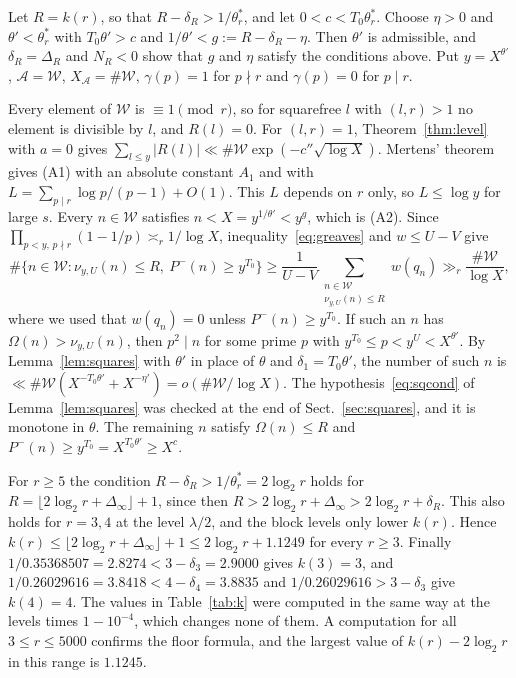 \documentclass[11pt]{amsart}
\makeatletter
\theoremstyle{definition}
\numberwithin{equation}{section}
\renewenvironment{proof}[1][\proofname]{\par\pushQED{\qed}\normalfont\topsep6\p@\@plus6\p@\relax\trivlist\item[\hskip\labelsep\upshape#1.]\ignorespaces}{\popQED\endtrivlist\@endpefalse}
\newcommand{\WW}{\mathcal{W}}
\makeatother
\begin{document}
\begin{proof}[Proof of Corollary~\ref{cor:almost}]
Let $R=k(r)$, so that $R-\delta_R>1/\theta^*_r$, and let $0<c<T_0\theta^*_r$. Choose $\eta>0$ and $\theta'<\theta^*_r$ with $T_0\theta'>c$ and $1/\theta'<g:=R-\delta_R-\eta$. Then $\theta'$ is admissible, and $\delta_R=\Delta_R$ and $N_R<0$ show that $g$ and $\eta$ satisfy the conditions above. Put $y=X^{\theta'}$, $\mathcal A=\WW$, $X_{\mathcal A}=\#\WW$, $\gamma(p)=1$ for $p\nmid r$ and $\gamma(p)=0$ for $p\mid r$.

Every element of $\WW$ is $\equiv1\pmod r$, so for squarefree $l$ with $(l,r)>1$ no element is divisible by $l$, and $R(l)=0$. For $(l,r)=1$, Theorem~\ref{thm:level} with $a=0$ gives $\sum_{l\le y}\lvert R(l)\rvert\ll\#\WW\exp(-c''\sqrt{\log X})$. Mertens' theorem gives (A1) with an absolute constant $A_1$ and with $L=\sum_{p\mid r}\log p/(p-1)+O(1)$. This $L$ depends on $r$ only, so $L\le\log y$ for large $s$. Every $n\in\WW$ satisfies $n<X=y^{1/\theta'}<y^g$, which is (A2). Since $\prod_{p<y,\,p\nmid r}(1-1/p)\asymp_r1/\log X$, inequality~\eqref{eq:greaves} and $w\le U-V$ give
\[
\#\{n\in\WW:\nu_{y,U}(n)\le R,\ P^-(n)\ge y^{T_0}\}\ge\frac1{U-V}\sum_{\substack{n\in\WW\\\nu_{y,U}(n)\le R}}w(q_n)\gg_r\frac{\#\WW}{\log X},
\]
where we used that $w(q_n)=0$ unless $P^-(n)\ge y^{T_0}$. If such an $n$ has $\Omega(n)>\nu_{y,U}(n)$, then $p^2\mid n$ for some prime $p$ with $y^{T_0}\le p<y^U<X^{\theta'}$. By Lemma~\ref{lem:squares} with $\theta'$ in place of $\theta$ and $\delta_1=T_0\theta'$, the number of such $n$ is $\ll\#\WW(X^{-T_0\theta'}+X^{-\eta'})=o(\#\WW/\log X)$. The hypothesis~\eqref{eq:sqcond} of Lemma~\ref{lem:squares} was checked at the end of Sect.~\ref{sec:squares}, and it is monotone in $\theta$. The remaining $n$ satisfy $\Omega(n)\le R$ and $P^-(n)\ge y^{T_0}=X^{T_0\theta'}\ge X^c$.

For $r\ge5$ the condition $R-\delta_R>1/\theta^*_r=2\log_2r$ holds for $R=\lfloor2\log_2r+\Delta_\infty\rfloor+1$, since then $R>2\log_2r+\Delta_\infty>2\log_2r+\delta_R$. This also holds for $r=3,4$ at the level $\lambda/2$, and the block levels only lower $k(r)$. Hence $k(r)\le\lfloor2\log_2r+\Delta_\infty\rfloor+1\le2\log_2r+1.1249$ for every $r\ge3$. Finally $1/0.35368507=2.8274<3-\delta_3=2.9000$ gives $k(3)=3$, and $1/0.26029616=3.8418<4-\delta_4=3.8835$ and $1/0.26029616>3-\delta_3$ give $k(4)=4$. The values in Table~\ref{tab:k} were computed in the same way at the levels times $1-10^{-4}$, which changes none of them. A computation for all $3\le r\le5000$ confirms the floor formula, and the largest value of $k(r)-2\log_2r$ in this range is $1.1245$.
\end{proof}
\end{document}
